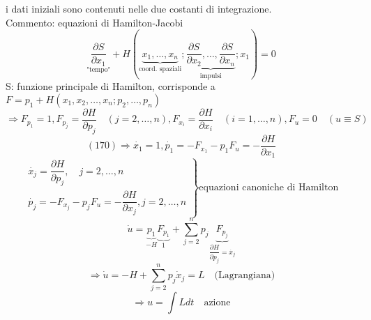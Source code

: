 \documentclass[a4paper,11pt]{report}
\begin{document}
i dati iniziali sono contenuti nelle due costanti di integrazione.\\
Commento: equazioni di Hamilton-Jacobi
$$
\underset{\text{"tempo"}}{\dfrac{\partial S}{\partial x_1}}+H(\underset{\text{coord. spaziali}}{\underbrace{x_1,\dots,x_n}};\underset{\text{impulsi}}{\underbrace{\dfrac{\partial S}{\partial x_2}, \dots,\dfrac{\partial S}{\partial x_n}}}; x_1)=0
$$
S: funzione principale di Hamilton, corrisponde a $F= p_1 + H(x_1,x_2,\dots,x_n;p_2,\dots,p_n)$
$$
\Rightarrow F_{p_1}=1, F_{p_j}=\dfrac{\partial H}{\partial p_j} \quad (j=2,\dots,n), F_{x_i}=\dfrac{\partial H}{\partial x_i} \quad (i=1,\dots,n), F_u=0 \quad (u\equiv S)
$$
$$
(170) \Rightarrow \dot{x_1}=1, \dot{p_1}=-F_{x_1}-p_1F_u = -\dfrac{\partial H}{\partial x_1}
$$
$$
\left.\begin{matrix}
\dot{x_j}=\dfrac{\partial H}{\partial p_j}, \quad j=2,\dots,n \\
\dot{p_j}=-F_{x_j}-p_jF_u=-\dfrac{\partial H}{\partial x_j}, j=2,\dots,n
\end{matrix}\right\} \text{equazioni canoniche di Hamilton}
$$
$$
\dot{u}=\underset{-H}{\underbrace{p_1}}\underset{1}{\underbrace{F_{p_1}}} + \sum_{j=2}^n p_j \underset{\dfrac{\partial H}{\partial p_j}=\dot{x_j}}{\underbrace{F_{p_j}}} 
$$
$$
\Rightarrow \dot{u}=-H + \sum_{j=2}^n p_j\dot{x}_j=L \quad \text{(Lagrangiana)}
$$
$$
\Rightarrow u=\int L dt \quad \text{azione}
$$
\end{document}
